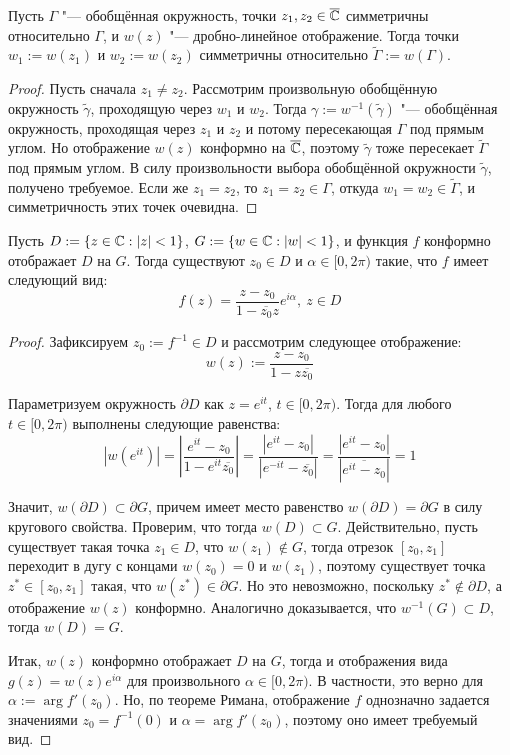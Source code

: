 \begin{proposition}
	Пусть $\Gamma$ "--- обобщённая окружность, точки $z_1, z_2 \in \overline{\mathbb{C}}$ симметричны относительно $\Gamma$, и $w(z)$ "--- дробно-линейное отображение. Тогда точки $w_1 := w(z_1)$ и $w_2  := w(z_2)$ симметричны относительно $\widetilde\Gamma := w(\Gamma)$.
\end{proposition}

\begin{proof}
	Пусть сначала $z_1 \ne z_2$. Рассмотрим произвольную обобщённую окружность $\widetilde{\gamma}$, проходящую через $w_1$ и $w_2$. Тогда $\gamma := w^{-1}(\widetilde\gamma)$ "--- обобщённая окружность, проходящая через $z_1$ и $z_2$ и потому пересекающая $\Gamma$ под прямым углом. Но отображение $w(z)$ конформно на $\overline{\mathbb{C}}$, поэтому $\widetilde \gamma$ тоже пересекает $\widetilde \Gamma$ под прямым углом. В силу произвольности выбора обобщённой окружности $\widetilde\gamma$, получено требуемое. Если же $z_1 = z_2$, то $z_1 = z_2 \in \Gamma$, откуда $w_1 = w_2 \in \widetilde\Gamma$, и симметричность этих точек очевидна.
\end{proof}

\begin{proposition}
	Пусть $D := \{z \in \mathbb{C}: |z| < 1\}$, $G := \{w \in \mathbb{C}: |w| < 1\}$, и функция $f$ конформно отображает $D$ на $G$. Тогда существуют $z_0 \in D$ и $\alpha \in [0, 2\pi)$ такие, что $f$ имеет следующий вид:
	\[f(z) = \frac{z - z_0}{1 - \overline{z_0}z}e^{i\alpha},~z \in D\]
\end{proposition}

\begin{proof}
	Зафиксируем $z_0 := f^{-1} \in D$ и рассмотрим следующее отображение:
	\[w(z) := \frac{z - z_0}{1 - z\overline{z_0}}\]
	
	Параметризуем окружность $\partial D$ как $z = e^{it}$, $t \in [0, 2\pi)$. Тогда для любого $t \in [0, 2\pi)$ выполнены следующие равенства:
	\[\left|w\left(e^{it}\right)\right| = \left|\frac{e^{it} - z_0}{1 - e^{it}\overline{z_0}}\right| = \frac{|e^{it} - z_0|}{|e^{-it} - \overline{z_0}|} = \frac{|e^{it} - z_0|}{|\overline{e^{it} - z_0}|} = 1\]
	
	Значит, $w(\partial D) \subset \partial G$, причем имеет место равенство  $w(\partial D) = \partial G$ в силу кругового свойства. Проверим, что тогда $w(D) \subset G$. Действительно, пусть существует такая точка $z_1 \in D$, что $w(z_1) \not\in G$, тогда отрезок $[z_0, z_1]$ переходит в дугу с концами $w(z_0) = 0$ и $w(z_1)$, поэтому существует точка $z^* \in [z_0, z_1]$ такая, что $w(z^*) \in \partial G$. Но это невозможно, поскольку $z^* \not \in \partial D$, а отображение $w(z)$ конформно. Аналогично доказывается, что $w^{-1}(G) \subset D$, тогда $w(D) = G$.
	
	Итак, $w(z)$ конформно отображает $D$ на $G$, тогда и отображения вида $g(z) = w(z)e^{i\alpha}$ для произвольного $\alpha \in [0, 2\pi)$. В частности, это верно для $\alpha := \arg{f'(z_0)}$. Но, по теореме Римана, отображение $f$ однозначно задается значениями $z_0 = f^{-1}(0)$ и $\alpha = \arg{f'(z_0)}$, поэтому оно имеет требуемый вид.
\end{proof}

